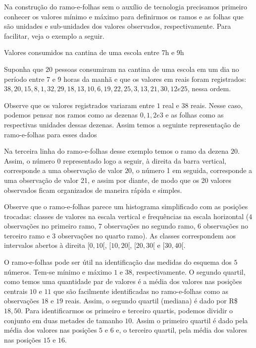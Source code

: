 Na construção do ramo-e-folhas sem o auxílio de tecnologia precisamos primeiro conhecer os valores mínimo e máximo para definirmos os ramos e as folhas que são unidades e sub-unidades dos valores observados, respectivamente. Para facilitar, veja o exemplo a seguir.

\begin{example}{Valores consumidos na cantina de uma escola entre 7h e 9h}

Suponha que $20$ pessoas consumiram na cantina de uma escola em um dia no período entre 7 e 9 horas da manhã e que os valores em reais foram registrados: $38, 20, 15, 8, 1, 32, 29, 18, 13, 10, 6, 19, 22, 25, 3, 13, 21, 30, 12 e 25$, nessa ordem.

Observe que os valores registrados variaram entre $1$ real e $38$ reais. Nesse caso, podemos pensar nos ramos como as dezenas 0$, 1, 2 e 3$ e as folhas como as respectivas unidades dessas dezenas. Assim temos a seguinte representação de ramo-e-folhas para esses dados

\begin{figure}[H]
\centering

\end{figure}

Na terceira linha do ramo-e-folhas desse exemplo temos o ramo da dezena $20$. Assim, o número $0$ representado logo a seguir, à direita da barra vertical, corresponde a uma observação de valor $20$, o número 1 em seguida, corresponde a uma observação de valor 21, e assim por diante, de modo que os 20 valores observados ficam organizados de maneira rápida e simples.

Observe que o ramo-e-folhas parece um histograma simplificado com as posições trocadas: classes de valores na escala vertical e frequências na escala horizontal ($4$ observações no primeiro ramo, $7$ observações no segundo ramo, $6$ observações no terceiro ramo e $3$ observações no quarto ramo). As classes correspondem aos intervalos abertos à direita $[0,10[$, $[10,20[$, $[20,30[$ e $[30,40[$.

O ramo-e-folhas pode ser útil na identificação das medidas do esquema dos $5$ números. Tem-se mínimo e máximo $1$ e $38$, respectivamente. O segundo quartil, como temos uma quantidade par de valores é a média dos valores nas posições centrais $10$ e $11$ que são facilmente identificadas no ramo-e-folhas como as observações $18$ e $19$ reais. Assim, o segundo quartil (mediana) é dado por R\$ $18,50$. Para identificarmos os primeiro e terceiro quartis, podemos dividir o conjunto em duas metades de tamanho $10$. Assim o primeiro quartil é dado pela média dos valores nas posições $5$ e $6$ e, o terceiro quartil, pela média dos valores nas posições $15$ e $16$.


\end{example}
